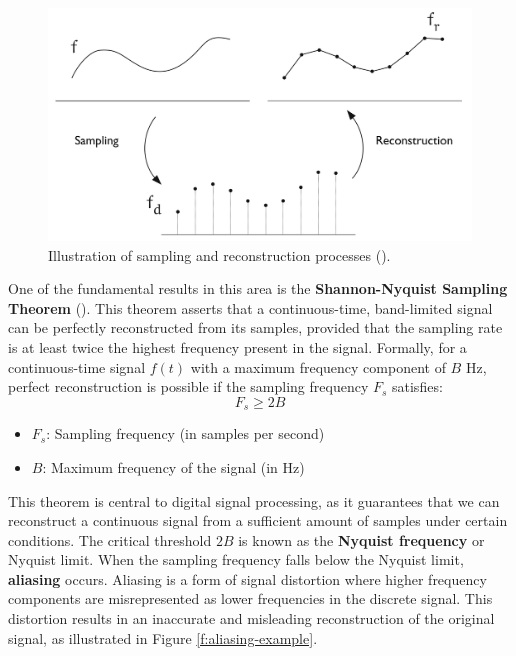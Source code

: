 \begin{figure}[!h]
  \centering
  \includegraphics[width=0.85\linewidth]{img/ch2/sampling-reconstruction.png}
  \caption{Illustration of sampling and reconstruction processes (\cite{ipcgVelho2014}).}
  \label{f:sampling-reconstuction}
\end{figure}


One of the fundamental results in this area is the \textbf{Shannon-Nyquist Sampling Theorem} (\cite{Shannon1949}). This theorem asserts that a continuous-time, band-limited signal can be perfectly reconstructed from its samples, provided that the sampling rate is at least twice the highest frequency present in the signal. Formally, for a continuous-time signal \( f(t) \) with a maximum frequency component of \( B \) Hz, perfect reconstruction is possible if the sampling frequency \( F_s \) satisfies:
\[
F_s \geq 2B
\]

\begin{itemize}
  \item \( F_s \): Sampling frequency (in samples per second)
  \item \( B \): Maximum frequency of the signal (in Hz)
\end{itemize}

This theorem is central to digital signal processing, as it guarantees that we can reconstruct a continuous signal from a sufficient amount of samples under certain conditions. The critical threshold \( 2B \) is known as the \textbf{Nyquist frequency} or Nyquist limit. When the sampling frequency falls below the Nyquist limit, \textbf{aliasing} occurs. Aliasing is a form of signal distortion where higher frequency components are misrepresented as lower frequencies in the discrete signal. This distortion results in an inaccurate and misleading reconstruction of the original signal, as illustrated in Figure \ref{f:aliasing-example}.

